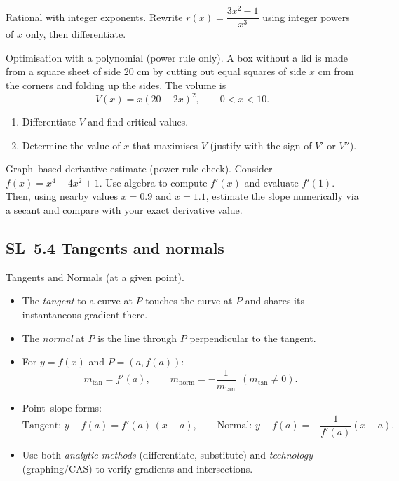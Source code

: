 \documentclass[11pt]{article}
\def\textbf#1{#1}%
\newcommand{\tocsubsection}[1]{\subsection{#1}}
\newcounter{question}
\begin{document}
\begin{question}
\textbf{Rational with integer exponents.}
Rewrite $r(x)=\dfrac{3x^{2}-1}{x^{3}}$ using integer powers of $x$ only, then differentiate.
\end{question}

\begin{question}
\textbf{Optimisation with a polynomial (power rule only).}
A box without a lid is made from a square sheet of side $20$ cm by cutting out equal squares of side $x$ cm from the corners and folding up the sides. The volume is
\[
V(x)=x(20-2x)^{2},\qquad 0<x<10.
\]
\begin{enumerate}
  \item Differentiate $V$ and find critical values.
  \item Determine the value of $x$ that maximises $V$ (justify with the sign of $V'$ or $V''$).
\end{enumerate}
\end{question}

\begin{question}
\textbf{Graph–based derivative estimate (power rule check).}
Consider $f(x)=x^{4}-4x^{2}+1$. Use algebra to compute $f'(x)$ and evaluate $f'(1)$. Then, using nearby values $x=0.9$ and $x=1.1$, estimate the slope numerically via a secant and compare with your exact derivative value.
\end{question}





\tocsubsection{SL 5.4 \; Tangents and normals}

\textbf{Tangents and Normals (at a given point).}
\begin{itemize}[itemsep=2pt]
  \item The \emph{tangent} to a curve at $P$ touches the curve at $P$ and shares its instantaneous gradient there.
  \item The \emph{normal} at $P$ is the line through $P$ perpendicular to the tangent.
  \item For $y=f(x)$ and $P=(a,f(a))$:
    \[
      m_{\text{tan}}=f'(a),\qquad 
      m_{\text{norm}}=-\frac{1}{m_{\text{tan}}}\ \ (m_{\text{tan}}\neq 0).
    \]
  \item Point–slope forms:
    \[
      \text{Tangent: } y-f(a)=f'(a)\,(x-a),\qquad
      \text{Normal: } y-f(a)=-\frac{1}{f'(a)}(x-a).
    \]
  \item Use both \emph{analytic methods} (differentiate, substitute) and \emph{technology}
        (graphing/CAS) to verify gradients and intersections.
\end{itemize}
\end{document}
